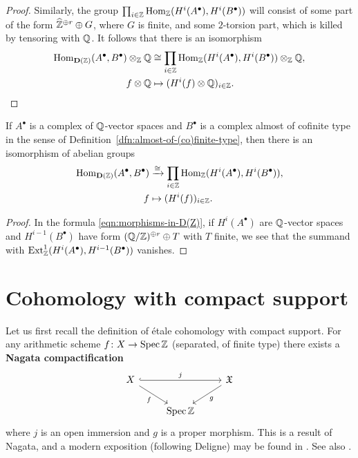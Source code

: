 \documentclass{article}
\numberwithin{equation}{section}
\begin{document}
\begin{appendices}
\begin{lemma}
\begin{proof}
    Similarly, the group
    $\prod_{i\in\mathbb{Z}} \operatorname{Hom}_{\mathbb{Z}} (H^i (A^\bullet), H^i (B^\bullet))$ will consist
    of some part of the form $\widehat{\mathbb{Z}}^{\oplus r} \oplus G$, where $G$
    is finite, and some $2$-torsion part, which is killed by tensoring with
    $\mathbb{Q}$. It follows that there is an isomorphism
    \begin{align*}
      \operatorname{Hom}_{\mathbf{D} (\mathbb{Z})} (A^\bullet, B^\bullet)\otimes_{\mathbb{Z}} \mathbb{Q} & \cong
      \prod_{i\in \mathbb{Z}} \operatorname{Hom}_{\mathbb{Z}} (H^i (A^\bullet), H^i (B^\bullet)) \otimes_{\mathbb{Z}} \mathbb{Q}, \\
      f\otimes\mathbb{Q} & \mapsto (H^i (f) \otimes \mathbb{Q})_{i\in\mathbb{Z}}. \qedhere
    \end{align*}
  \end{proof}
\end{lemma}

\begin{lemma}
  \label{lemma:morphisms-in-DAb-between-cplx-of-Q-vs-and-almost-cofinite-type-cplx}
  If $A^\bullet$ is a complex of $\mathbb{Q}$-vector spaces and $B^\bullet$ is a
  complex almost of cofinite type in the sense of
  Definition~\ref{dfn:almost-of-(co)finite-type}, then there is an isomorphism
  of abelian groups
  \begin{align*}
    \operatorname{Hom}_{\mathbf{D} (\mathbb{Z})} (A^\bullet, B^\bullet) & \xrightarrow{\cong}
    \prod_{i\in \mathbb{Z}} \operatorname{Hom}_{\mathbb{Z}} (H^i (A^\bullet), H^i (B^\bullet)),\\
    f & \mapsto (H^i (f))_{i\in \mathbb{Z}}.
  \end{align*}

  \begin{proof}
    In the formula \eqref{eqn:morphisms-in-D(Z)}, if $H^i (A^\bullet)$ are
    $\mathbb{Q}$-vector spaces and $H^{i-1} (B^\bullet)$ have form
    $(\mathbb{Q}/\mathbb{Z})^{\oplus r} \oplus T$ with $T$ finite, we see that the summand with
    $\operatorname{Ext}_{\mathbb{Z}}^1 (H^i (A^\bullet), H^{i-1} (B^\bullet))$ vanishes.
  \end{proof}
\end{lemma}


\pagebreak
\section{Cohomology with compact support}
\label{app:modified-cohomology-with-compact-support}

Let us first recall the definition of étale cohomology with compact support.
For any arithmetic scheme $f\colon X\to \operatorname{Spec} \mathbb{Z}$ (separated, of finite type)
there exists a \textbf{Nagata compactification}
\[ \begin{tikzcd}
X \ar[hookrightarrow]{rr}{j}\ar{dr}[swap]{f} & & \mathfrak{X} \ar{dl}{g} \\
 & \Spec \ZZ
\end{tikzcd} \]
where $j$ is an open immersion and $g$ is a proper morphism. This is a result of
Nagata, and a modern exposition (following Deligne) may be found in
\cite{Conrad-Deligne-Nagata,Conrad-Deligne-Nagata-erratum}. See also
\cite[Exposé~XVII]{SGA4}.


\end{appendices}
\end{document}
